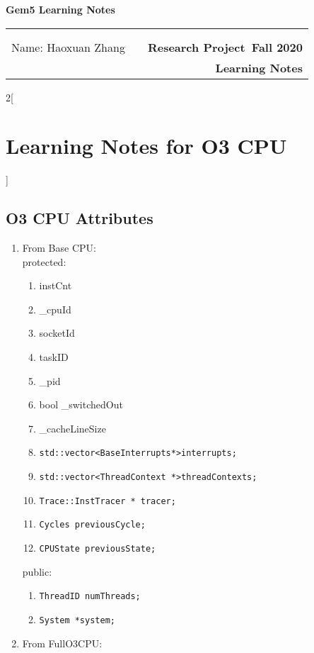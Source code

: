 \documentclass[11pt]{article}
\makeatletter
\newcommand{\course}{Research Project}
\newcommand{\semester}{Fall 2020}
\newcommand{\hwk}{Learning Notes}
\newcommand{\reportname}{Gem5 Learning Notes}
\renewcommand\maketitle{
\begin{center}
  {\huge\bf\reportname}\\
\begin{tabular*}{6.44in}{l @{\extracolsep{\fill}}c r}
\bfseries   &   &  \bfseries \\
\bfseries   &   &  \bfseries \\
Name: Haoxuan Zhang \bfseries  &  & \bfseries \course ~\semester\\
 \bfseries&  & \bfseries  \hwk
\end{tabular*}
\end{center} }
\makeatother
\begin{document}
\maketitle
{}

\begin{multicols}{2}[\section{Learning Notes for O3 CPU}]

\subsection{O3 CPU Attributes}
	\begin{enumerate}
		\item From Base CPU:\\
		
		protected:
			\begin{enumerate}[label={\arabic*.}]
				\item instCnt
				\item \_cpuId
        \item socketId
        \item taskID
        \item \_pid
        \item bool \_switchedOut
        \item \_cacheLineSize
        \item \texttt{std::vector\textless BaseInterrupts*\textgreater interrupts;}
        \item \texttt{std::vector\textless ThreadContext *\textgreater threadContexts;}
        \item \texttt{Trace::InstTracer * tracer;}
        \item \texttt{Cycles previousCycle;}
    		\item \texttt{CPUState previousState;}
			\end{enumerate}
		public:
			\begin{enumerate}[label={\arabic*.}]
				\item \texttt{ThreadID numThreads;}
				\item \texttt{System *system;}
			\end{enumerate}
			
		\item From FullO3CPU:\\
		

\end{enumerate}
\end{multicols}
\end{document}
